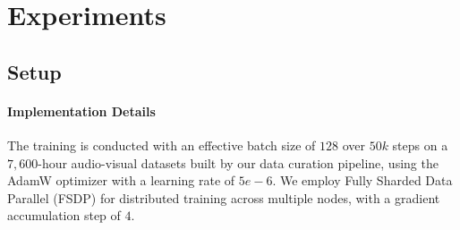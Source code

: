 \section{Experiments}
\subsection{Setup}
\paragraph{Implementation Details}
The training is conducted with an effective batch size of $128$ over $50k$ steps on a $7,600$-hour audio-visual datasets built by our data curation pipeline,
using the AdamW optimizer with a learning rate of $5e-6$. We employ Fully Sharded Data Parallel (FSDP) for distributed training across multiple nodes, with a gradient accumulation step of $4$.
